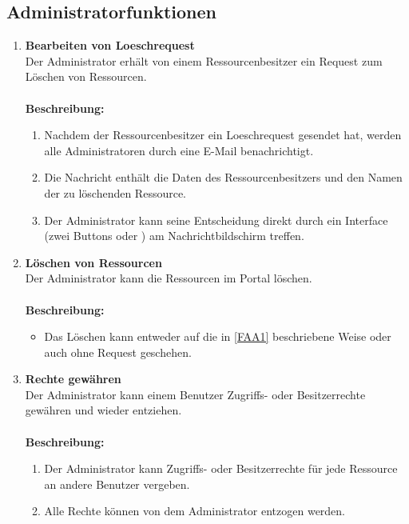 \documentclass[parskip=full,11pt]{scrartcl}
\def\threedigits#1{%
  \ifnum#1<10 0\fi
  \ifnum#1<1 0\fi
  \number#1}
\begin{document}
\subsection{Administratorfunktionen}
\begin{enumerate}[label={\textbf{/F\protect\threedigits{\theenumi}0/}}, leftmargin=*, resume]
\item \label{FAA1}\textbf{Bearbeiten von Loeschrequest}\\ Der Administrator erhält von einem Ressourcenbesitzer ein Request zum Löschen von Ressourcen.\\\\
\textbf{Beschreibung:}\\
\begin{enumerate}[label=(\arabic*), leftmargin=*]
\item Nachdem der Ressourcenbesitzer ein Loeschrequest gesendet hat, werden alle Administratoren durch eine E-Mail benachrichtigt.
\item Die Nachricht enthält die Daten des Ressourcenbesitzers und den Namen der zu löschenden Ressource.
\item Der Administrator kann seine Entscheidung direkt durch ein Interface (zwei Buttons \grqq  \: oder \grqq  \:) am Nachrichtbildschirm treffen. 
\end{enumerate}


\item \label{FAA2} \textbf{Löschen von Ressourcen}\\ Der Administrator kann die Ressourcen im Portal löschen.\\\\
\textbf{Beschreibung:}\\
\begin{itemize}[itemsep=0pt, leftmargin=*]
\item Das Löschen kann entweder auf die in \ref{FAA1} beschriebene Weise oder auch ohne Request geschehen.
\end{itemize}

\newpage
\item \label{FAA3} \textbf{Rechte gewähren}\\ Der Administrator kann einem Benutzer Zugriffs- oder Besitzerrechte gewähren und wieder entziehen.\\\\
\textbf{Beschreibung:}\\
\begin{enumerate}[label=(\arabic*), leftmargin=*]
	\item Der Administrator kann Zugriffs- oder Besitzerrechte für jede Ressource an andere Benutzer vergeben.
	\item Alle Rechte können von dem Administrator entzogen werden.
	\end{enumerate}


\end{enumerate}
\end{document}
